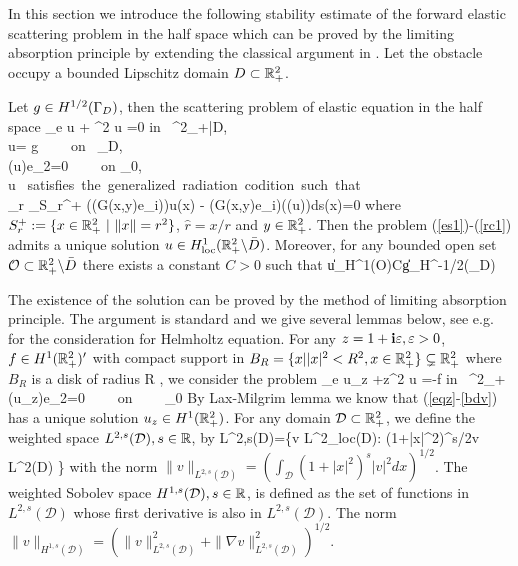 \documentclass[12pt]{iopart}
\begin{document}
In this section we introduce the following stability estimate of the forward elastic scattering problem in the half space which can be proved by the limiting absorption principle by extending the classical argument in \cite{leis,wilcox1975,Yves1988}. Let the obstacle occupy a bounded Lipschitz domain $D\subset {\mathbb{R}}^2_+$.
\begin{thm} \label{eu1}
	Let $g \in H^{1/2}(\Gamma_D)$, then the scattering problem of elastic equation in the half space
	\be
	\Delta_e u + \omega^2 u =0 \qquad\mbox{\rm in } \R^2_+\bks \bar{D}, \label{es1}\ \ \
	\\ u= g \ \ \ \ \mbox{\rm on } \Ga_D, \label{es2} \\
	\sigma(u)e_2=0 \ \ \ \ \mbox{\rm on} \Ga_0, \label{es3} \\
	u \ \mbox{satisfies the generalized radiation codition\cite{Guzina2006} such that} \nn \\\label{rc1}
	\lim_{r\to\infty}  \int_{S_r^+} (\sigma(G(x,y)e_i))\cdot u(x) - (G(x,y)e_i)\cdot (\sigma(u)\hat{r})ds(x)=0
	\ee
	where $S_r^+:=\{x\in {\mathbb{R}}^2_+ \ | \ \|x\|=r^2\}$, $\hat{r}=x/r$ and $y\in {\mathbb{R}}_+^2$. Then the problem (\ref{es1})-(\ref{rc1})
	admits a unique solution $u \in H^{1}_{\rm loc}({\mathbb{R}}^2_+ \backslash \bar D)$. Moreover, for any bounded open set $\mathcal O\subset {\mathbb{R}}^2_+\backslash\bar D$ there exists a constant $C>0$ such that
	\be \label{es4}
	\|u\|_{H^{1}(\mathcal O)}\le C\|g\|_{H^{-1/2}(\Ga_D)}
	\ee
\end{thm}
The existence of the solution can be proved by the method of limiting absorption principle. The argument is standard and we give several lemmas below, see e.g. \cite{leis} for the consideration for Helmholtz equation. For any $z=1+\mathbf{i}\varepsilon,\varepsilon>0$, $f\in H^{1}({\mathbb{R}}^2_+)'$ with compact support in $B_R=\{x||x|^2<R^2,x\in{\mathbb{R}}^2_+\}\subsetneq{\mathbb{R}}_+^2$ where $B_R$ is a disk of radius R , we consider the problem
\be \label{eqz}
\Delta_e u_z +z\omega^2 u =-f \qquad\mbox{\rm in } \R^2_+ \\
\sigma(u_z)e_2=0 \ \ \ \ \mbox{\rm on} \ \ \ \  \Ga_0 \label{bdv}
\ee
By Lax-Milgrim lemma we know that (\ref{eqz}-\ref{bdv}) has a unique solution $u_z\in H^1({\mathbb{R}}^2_+)$. For any domain $\mathcal D \subset {\mathbb{R}}^2_+$, we define the weighted space $L^{2,s}(\mathcal D),s \in {\mathbb{R}}$, by
\ben
L^{2,s}(\mathcal D)=\{v \in L^2_{\rm loc}(\mathcal D): (1+|x|^2)^{s/2}v \in L^2(\mathcal D) \}
\een
with the norm $\| v \|_{ L^{2,s}(\mathcal D)} = (\int_{\mathcal D}(1+|x|^2)^{s}|v|^2 dx )^{1/2}$. The weighted Sobolev space $H^{1,s}(\mathcal D),s \in {\mathbb{R}}$,
is defined as the set of functions in $L^{2,s}(\mathcal D)$ whose first derivative is also in $L^{2,s}(\mathcal D)$. The norm
$\| v \|_{ H^{1,s}(\mathcal D)} = (\| v \|^2_{ L^{2,s} (\mathcal D)} + \| \nabla v \|^2_{ L^{2,s}(\mathcal D)})^{1/2}$.
\end{document}
